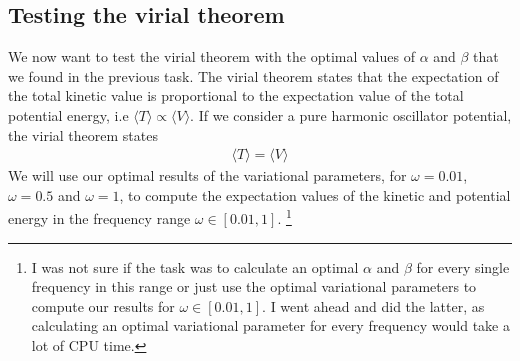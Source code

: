 \documentclass[12pt]{article}
\begin{document}
\subsection{Testing the virial theorem}
We now want to test the virial theorem with the optimal values of $\alpha$ and $\beta$ that we found in the previous  task. The virial theorem states that the expectation of the total kinetic value is proportional to the expectation value of the total potential energy, i.e $\langle T \rangle \propto \langle V \rangle$. If we consider a pure harmonic oscillator potential, the virial theorem states
\begin{align*}
\langle T \rangle = \langle V \rangle
\end{align*}
We will use our optimal results of the variational parameters, for $\omega = 0.01$, $\omega = 0.5$ and $\omega=1$, to compute the expectation values of the kinetic and potential energy in the frequency range $\omega \in [0.01, 1]$. \footnote{I was not sure if the task was to calculate an optimal $\alpha$ and $\beta$ for every single frequency in this range or just use the optimal variational parameters to compute our results for $\omega \in [0.01, 1]$. I went ahead and did the latter, as calculating an optimal variational parameter for every frequency would take a lot of CPU time.}
\end{document}

